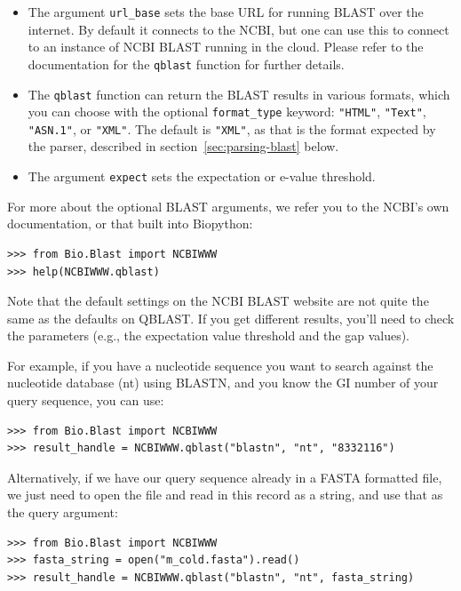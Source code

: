 \begin{itemize}
\item The argument \verb|url_base| sets the base URL for running BLAST over the
internet. By default it connects to the NCBI, but one can use this to connect
to an instance of NCBI BLAST running in the cloud. Please refer to the documentation
for the \verb|qblast| function for further details.
\item The \verb|qblast| function can return the BLAST results in various
formats, which you can choose with the optional \verb|format_type| keyword:
\verb|"HTML"|, \verb|"Text"|, \verb|"ASN.1"|, or \verb|"XML"|.
The default is \verb|"XML"|, as that is the format expected by the parser,
described in section~\ref{sec:parsing-blast} below.
\item The argument \verb|expect| sets the expectation or e-value threshold.
\end{itemize}

For more about the optional BLAST arguments, we refer you to the NCBI's own
documentation, or that built into Biopython:

\begin{verbatim}
>>> from Bio.Blast import NCBIWWW
>>> help(NCBIWWW.qblast)
\end{verbatim}

Note that the default settings on the NCBI BLAST website are not quite
the same as the defaults on QBLAST. If you get different results, you'll
need to check the parameters (e.g., the expectation value threshold and
the gap values).

For example, if you have a nucleotide sequence you want to search against
the nucleotide database (nt) using BLASTN, and you know the GI number of your
query sequence, you can use:

\begin{verbatim}
>>> from Bio.Blast import NCBIWWW
>>> result_handle = NCBIWWW.qblast("blastn", "nt", "8332116")
\end{verbatim}

Alternatively, if we have our query sequence already in a FASTA formatted
file, we just need to open the file and read in this record as a string,
and use that as the query argument:

\begin{verbatim}
>>> from Bio.Blast import NCBIWWW
>>> fasta_string = open("m_cold.fasta").read()
>>> result_handle = NCBIWWW.qblast("blastn", "nt", fasta_string)
\end{verbatim}

